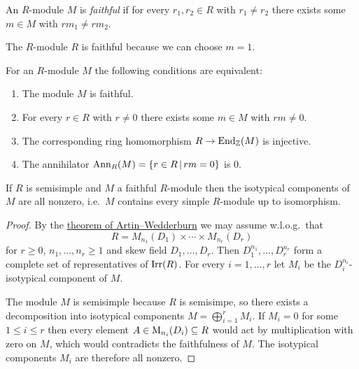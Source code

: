 \begin{definition}
  An $R$-module $M$ is \emph{faithful} if for every $r_1, r_2 \in R$ with $r_1 \neq r_2$ there exists some $m \in M$ with $r m_1 \neq r m_2$.
\end{definition}


\begin{example}
  The $R$-module $R$ is faithful because we can choose $m = 1$.
\end{example}


\begin{recall}
  For an $R$-module $M$ the following conditions are equivalent:
  \begin{enumerate}
    \item
      The module $M$ is faithful.
    \item
      For every $r \in R$ with $r \neq 0$ there exists some $m \in M$ with $rm \neq 0$.
    \item
      The corresponding ring homomorphism $R \to \operatorname{End}_{\mathbb{Z}}(M)$ is injective.
    \item
      The annihilator $\Ann_R(M) = \{r \in R \suchthat rm = 0\}$ is $0$.
  \end{enumerate}
\end{recall}


\begin{corollary}
  \label{corollary: faithful over ss contains ever simple}
  If $R$ is semisimple and $M$ a faithful $R$-module then the isotypical components of $M$ are all nonzero, i.e.\ $M$ contains every simple $R$-module up to isomorphism.
\end{corollary}


\begin{proof}
  By the \hyperref[theorem: artin wedderburn theorem]{theorem of Artin--Wedderburn} we may assume w.l.o.g.\ that
  \[
    R = M_{n_1}(D_1) \times \dotsb \times M_{n_r}(D_r)
  \]
  for $r \geq 0$, $n_1, \dotsc, n_r \geq 1$ and skew field $D_1, \dotsc, D_r$.
  Then $D_1^{n_1}, \dotsc, D_r^{n_r}$ form a complete set of representatives of $\operatorname{Irr}(R)$.
  For every $i = 1, \dotsc, r$ let $M_i$ be the $D_i^{n_i}$-isotypical component of $M$.
  
  The module $M$ is semisimple because $R$ is semisimpe, so there exists a decomposition into isotypical components $M = \bigoplus_{i=1}^r M_i$.
  If $M_i = 0$ for some $1 \leq i \leq r$ then every element $A \in \operatorname{M}_{n_i}(D_i) \subseteq R$ would act by multiplication with zero on $M$, which would contradicts the faithfulness of $M$.
  The isotypical components $M_i$ are therefore all nonzero.
\end{proof}





